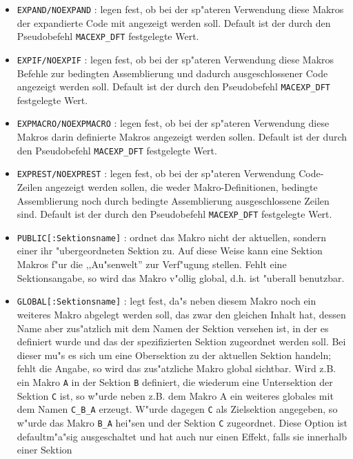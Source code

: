 \documentclass[12pt,a4paper,twoside]{report}
\newcommand{\tty}[1]{{\tt #1}}
\begin{document}
\begin{itemize}
\item{\tty{EXPAND/NOEXPAND} : legen fest, ob bei der sp"ateren
      Verwendung diese Makros der expandierte Code mit angezeigt
      werden soll.  Default ist der durch den Pseudobefehl
      \tty{MACEXP\_DFT} festgelegte Wert.}
\item{\tty{EXPIF/NOEXPIF} : legen fest, ob bei der sp"ateren
      Verwendung diese Makros Befehle zur bedingten Assemblierung
      und dadurch ausgeschlossener Code angezeigt werden soll.  Default
      ist der durch den Pseudobefehl \tty{MACEXP\_DFT} festgelegte Wert.}
\item{\tty{EXPMACRO/NOEXPMACRO} : legen fest, ob bei der sp"ateren
      Verwendung diese Makros darin definierte Makros angezeigt werden
      sollen.  Default ist der durch den Pseudobefehl
      \tty{MACEXP\_DFT} festgelegte Wert.}
\item{\tty{EXPREST/NOEXPREST} : legen fest, ob bei der sp"ateren
      Verwendung Code-Zeilen angezeigt werden sollen, die weder
      Makro-Definitionen, bedingte Assemblierung noch durch bedingte
      Assemblierung ausgeschlossene Zeilen sind. Default ist der durch den
      Pseudobefehl \tty{MACEXP\_DFT} festgelegte Wert.}
\item{\tty{PUBLIC[:Sektionsname]} : ordnet das Makro nicht der
      aktuellen, sondern einer ihr "ubergeordneten Sektion zu.
      Auf diese Weise kann eine Sektion Makros f"ur die ,,Au"senwelt''
      zur Verf"ugung stellen.  Fehlt eine Sektionsangabe, so wird das
      Makro v"ollig global, d.h. ist "uberall benutzbar.}
\item{\tty{GLOBAL[:Sektionsname]} : legt fest, da"s neben diesem
      Makro noch ein weiteres Makro abgelegt werden soll, das zwar
      den gleichen Inhalt hat, dessen Name aber zus"atzlich mit dem
      Namen der Sektion versehen ist, in der es definiert wurde und
      das der spezifizierten Sektion zugeordnet werden soll.  Bei
      dieser mu"s es sich um eine Obersektion zu der aktuellen Sektion
      handeln; fehlt die Angabe, so wird das zus"atzliche Makro
      global sichtbar.  Wird z.B. ein Makro \tty{A} in der Sektion \tty{B}
      definiert, die wiederum eine Untersektion der Sektion \tty{C} ist,
      so w"urde neben z.B. dem Makro A ein weiteres globales mit dem
      Namen \tty{C\_B\_A} erzeugt.  W"urde dagegen \tty{C} als Zielsektion
      angegeben, so w"urde das Makro \tty{B\_A} hei"sen und der Sektion
      \tty{C} zugeordnet.  Diese Option ist defaultm"a"sig ausgeschaltet und
      hat auch nur einen Effekt, falls sie innerhalb einer Sektion
}
\end{itemize}
\end{document}
